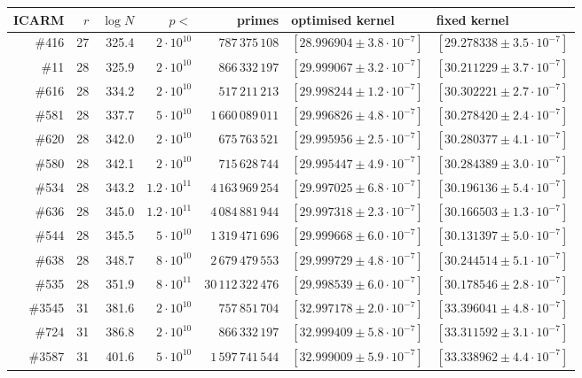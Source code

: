 \documentclass[11pt]{amsart}
\theoremstyle{remark}
\theoremstyle{definition}
\begin{document}
\begin{table}[!ht]
\centering\footnotesize
\setlength{\tabcolsep}{4pt}
\begin{tabular}{rrrrrll}
\toprule
ICARM & $r$ & $\log N$ & $p<$ & primes & optimised kernel & fixed kernel\\
\midrule
\#416 & 27 & 325.4 & $2\cdot10^{10}$ & $787\,375\,108$ & $[28.996904\pm3.8\cdot10^{-7}]$ & $[29.278338\pm3.5\cdot10^{-7}]$\\
\#11 & 28 & 325.9 & $2\cdot10^{10}$ & $866\,332\,197$ & $[29.999067\pm3.2\cdot10^{-7}]$ & $[30.211229\pm3.7\cdot10^{-7}]$\\
\#616 & 28 & 334.2 & $2\cdot10^{10}$ & $517\,211\,213$ & $[29.998244\pm1.2\cdot10^{-7}]$ & $[30.302221\pm2.7\cdot10^{-7}]$\\
\#581 & 28 & 337.7 & $5\cdot10^{10}$ & $1\,660\,089\,011$ & $[29.996826\pm4.8\cdot10^{-7}]$ & $[30.278420\pm2.4\cdot10^{-7}]$\\
\#620 & 28 & 342.0 & $2\cdot10^{10}$ & $675\,763\,521$ & $[29.995956\pm2.5\cdot10^{-7}]$ & $[30.280377\pm4.1\cdot10^{-7}]$\\
\#580 & 28 & 342.1 & $2\cdot10^{10}$ & $715\,628\,744$ & $[29.995447\pm4.9\cdot10^{-7}]$ & $[30.284389\pm3.0\cdot10^{-7}]$\\
\#534 & 28 & 343.2 & $1.2\cdot10^{11}$ & $4\,163\,969\,254$ & $[29.997025\pm6.8\cdot10^{-7}]$ & $[30.196136\pm5.4\cdot10^{-7}]$\\
\#636 & 28 & 345.0 & $1.2\cdot10^{11}$ & $4\,084\,881\,944$ & $[29.997318\pm2.3\cdot10^{-7}]$ & $[30.166503\pm1.3\cdot10^{-7}]$\\
\#544 & 28 & 345.5 & $5\cdot10^{10}$ & $1\,319\,471\,696$ & $[29.999668\pm6.0\cdot10^{-7}]$ & $[30.131397\pm5.0\cdot10^{-7}]$\\
\#638 & 28 & 348.7 & $8\cdot10^{10}$ & $2\,679\,479\,553$ & $[29.999729\pm4.8\cdot10^{-7}]$ & $[30.244514\pm5.1\cdot10^{-7}]$\\
\#535 & 28 & 351.9 & $8\cdot10^{11}$ & $30\,112\,322\,476$ & $[29.998539\pm6.0\cdot10^{-7}]$ & $[30.178546\pm2.8\cdot10^{-7}]$\\
\#3545 & 31 & 381.6 & $2\cdot10^{10}$ & $757\,851\,704$ & $[32.997178\pm2.0\cdot10^{-7}]$ & $[33.396041\pm4.8\cdot10^{-7}]$\\
\#724 & 31 & 386.8 & $2\cdot10^{10}$ & $866\,332\,197$ & $[32.999409\pm5.8\cdot10^{-7}]$ & $[33.311592\pm3.1\cdot10^{-7}]$\\
\#3587 & 31 & 401.6 & $5\cdot10^{10}$ & $1\,597\,741\,544$ & $[32.999009\pm5.9\cdot10^{-7}]$ & $[33.338962\pm4.4\cdot10^{-7}]$\\

\end{tabular}
\end{table}
\end{document}
